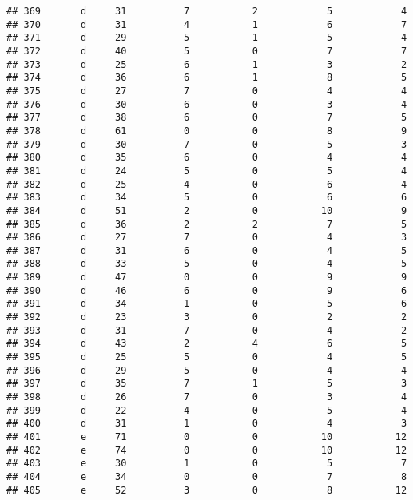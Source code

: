 \documentclass[
]{article}
\begin{document}
\begin{verbatim}
## 369       d     31          7           2            5            4
## 370       d     31          4           1            6            7
## 371       d     29          5           1            5            4
## 372       d     40          5           0            7            7
## 373       d     25          6           1            3            2
## 374       d     36          6           1            8            5
## 375       d     27          7           0            4            4
## 376       d     30          6           0            3            4
## 377       d     38          6           0            7            5
## 378       d     61          0           0            8            9
## 379       d     30          7           0            5            3
## 380       d     35          6           0            4            4
## 381       d     24          5           0            5            4
## 382       d     25          4           0            6            4
## 383       d     34          5           0            6            6
## 384       d     51          2           0           10            9
## 385       d     36          2           2            7            5
## 386       d     27          7           0            4            3
## 387       d     31          6           0            4            5
## 388       d     33          5           0            4            5
## 389       d     47          0           0            9            9
## 390       d     46          6           0            9            6
## 391       d     34          1           0            5            6
## 392       d     23          3           0            2            2
## 393       d     31          7           0            4            2
## 394       d     43          2           4            6            5
## 395       d     25          5           0            4            5
## 396       d     29          5           0            4            4
## 397       d     35          7           1            5            3
## 398       d     26          7           0            3            4
## 399       d     22          4           0            5            4
## 400       d     31          1           0            4            3
## 401       e     71          0           0           10           12
## 402       e     74          0           0           10           12
## 403       e     30          1           0            5            7
## 404       e     34          0           0            7            8
## 405       e     52          3           0            8           12

\end{verbatim}
\end{document}
